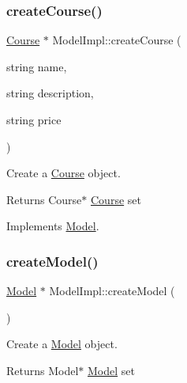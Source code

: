 \subsubsection{\texorpdfstring{create\+Course()}{createCourse()}}
{\footnotesize\ttfamily \hyperlink{classCourse}{Course} $\ast$ Model\+Impl\+::create\+Course (\begin{DoxyParamCaption}\item[{string}]{name,  }\item[{string}]{description,  }\item[{string}]{price }\end{DoxyParamCaption})\hspace{0.3cm}{\ttfamily [virtual]}}



Create a \hyperlink{classCourse}{Course} object. 

\begin{DoxyReturn}{Returns}
Course$\ast$ \hyperlink{classCourse}{Course} set 
\end{DoxyReturn}


Implements \hyperlink{classModel_ab62d035cd5240332e249d39ff9f98f9a}{Model}.

\mbox{\label{classModelImpl_a8a9167b35336431e394f0042271620cb}} 
\subsubsection{\texorpdfstring{create\+Model()}{createModel()}}
{\footnotesize\ttfamily \hyperlink{classModel}{Model} $\ast$ Model\+Impl\+::create\+Model (\begin{DoxyParamCaption}{ }\end{DoxyParamCaption})\hspace{0.3cm}{\ttfamily [static]}}



Create a \hyperlink{classModel}{Model} object. 

\begin{DoxyReturn}{Returns}
Model$\ast$ \hyperlink{classModel}{Model} set 
\end{DoxyReturn}
\mbox{\label{classModelImpl_affad955ee2bdbfc58ac049632cd9668b}} 

